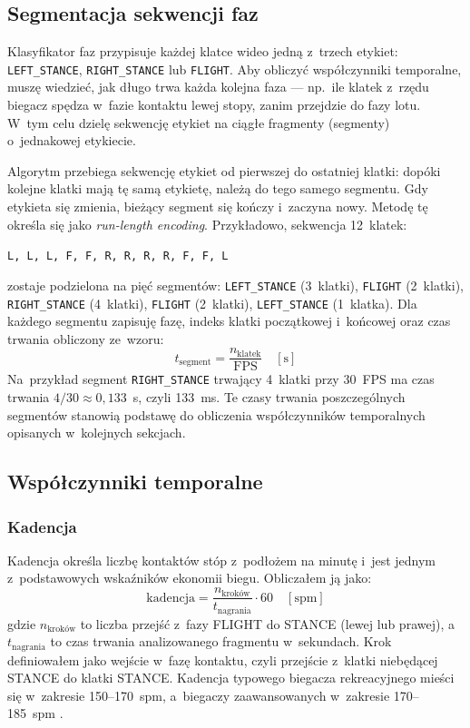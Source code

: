 \subsection{Segmentacja sekwencji faz}
\label{sec:segmentacja}

Klasyfikator faz przypisuje każdej klatce wideo jedną z~trzech etykiet: \texttt{LEFT\_STANCE}, \texttt{RIGHT\_STANCE} lub \texttt{FLIGHT}. Aby obliczyć współczynniki temporalne, muszę wiedzieć, jak długo trwa każda kolejna faza --- np.~ile klatek z~rzędu biegacz spędza w~fazie kontaktu lewej stopy, zanim przejdzie do fazy lotu. W~tym celu dzielę sekwencję etykiet na ciągłe fragmenty (segmenty) o~jednakowej etykiecie.

Algorytm przebiega sekwencję etykiet od pierwszej do ostatniej klatki: dopóki kolejne klatki mają tę samą etykietę, należą do tego samego segmentu. Gdy etykieta się zmienia, bieżący segment się kończy i~zaczyna nowy. Metodę tę określa się jako \textit{run-length encoding}. Przykładowo, sekwencja 12~klatek:

\begin{center}
\small
\texttt{L, L, L, F, F, R, R, R, R, F, F, L}
\end{center}

\noindent
zostaje podzielona na pięć segmentów: \texttt{LEFT\_STANCE} (3~klatki), \texttt{FLIGHT} (2~klatki), \texttt{RIGHT\_STANCE} (4~klatki), \texttt{FLIGHT} (2~klatki), \texttt{LEFT\_STANCE} (1~klatka). Dla każdego segmentu zapisuję fazę, indeks klatki początkowej i~końcowej oraz czas trwania obliczony ze~wzoru:
\[
t_{\text{segment}} = \frac{n_{\text{klatek}}}{\text{FPS}} \quad [\text{s}]
\]
Na~przykład segment \texttt{RIGHT\_STANCE} trwający 4~klatki przy 30~FPS ma czas trwania $4 / 30 \approx 0{,}133$~s, czyli 133~ms. Te czasy trwania poszczególnych segmentów stanowią podstawę do obliczenia współczynników temporalnych opisanych w~kolejnych sekcjach.

\subsection{Współczynniki temporalne}
\label{sec:temporal}

\subsubsection{Kadencja}

Kadencja określa liczbę kontaktów stóp z~podłożem na minutę i~jest jednym z~podstawowych wskaźników ekonomii biegu. Obliczałem ją jako:
\[
\text{kadencja} = \frac{n_{\text{kroków}}}{t_{\text{nagrania}}} \cdot 60 \quad [\text{spm}]
\]
gdzie $n_{\text{kroków}}$ to liczba przejść z~fazy FLIGHT do STANCE (lewej lub prawej), a~$t_{\text{nagrania}}$ to czas trwania analizowanego fragmentu w~sekundach. Krok definiowałem jako wejście w~fazę kontaktu, czyli przejście z~klatki niebędącej STANCE do klatki STANCE. Kadencja typowego biegacza rekreacyjnego mieści się w~zakresie 150--170~spm, a~biegaczy zaawansowanych w~zakresie 170--185~spm \cite{heiderscheit2011}.

